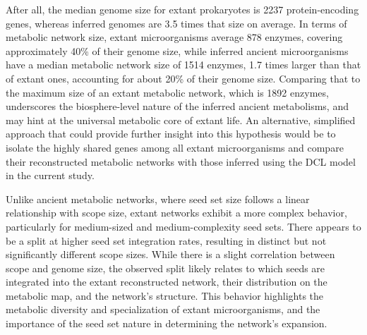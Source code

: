 After all, the median genome size for extant prokaryotes is 2237 protein-encoding genes, whereas inferred genomes are 3.5 times that size on average. In terms of metabolic network size, extant microorganisms average 878 enzymes, covering approximately 40\% of their genome size, while inferred ancient microorganisms have a median metabolic network size of 1514 enzymes, 1.7 times larger than that of extant ones, accounting for about 20\% of their genome size. Comparing that to the maximum size of an extant metabolic network, which is 1892 enzymes, underscores the biosphere-level nature of the inferred ancient metabolisms, and may hint at the universal metabolic core of extant life. An alternative, simplified approach that could provide further insight into this hypothesis would be to isolate the highly shared genes among all extant microorganisms and compare their reconstructed metabolic networks with those inferred using the DCL model in the current study.

Unlike ancient metabolic networks, where seed set size follows a linear relationship with scope size, extant networks exhibit a more complex behavior, particularly for medium-sized and medium-complexity seed sets. There appears to be a split at higher seed set integration rates, resulting in distinct but not significantly different scope sizes. While there is a slight correlation between scope and genome size, the observed split likely relates to which seeds are integrated into the extant reconstructed network, their distribution on the metabolic map, and the network's structure. This behavior highlights the metabolic diversity and specialization of extant microorganisms, and the importance of the seed set nature in determining the network's expansion.
